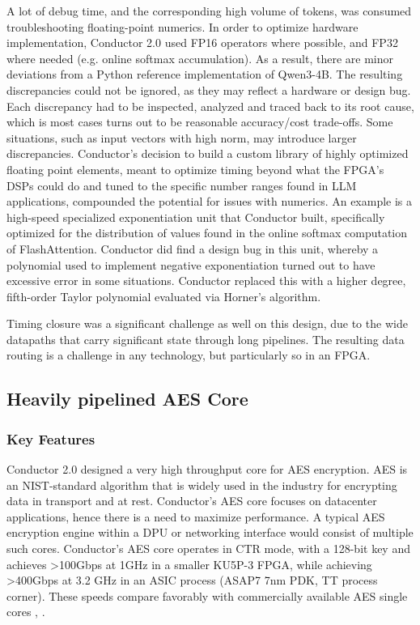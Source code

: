 A lot of debug time, and the corresponding high volume of tokens, was consumed troubleshooting floating-point numerics. In order to optimize hardware implementation, Conductor 2.0 used FP16 operators where possible, and FP32 where needed (e.g. online softmax accumulation). As a result, there are minor deviations from a Python reference implementation of Qwen3-4B. The resulting discrepancies could not be ignored, as they may reflect a hardware or design bug. Each discrepancy had to be inspected, analyzed and traced back to its root cause, which is most cases turns out to be reasonable accuracy/cost trade-offs. Some situations, such as input vectors with high norm, may introduce larger discrepancies. Conductor's decision to build a custom library of highly optimized floating point elements, meant to optimize timing beyond what the FPGA's DSPs could do and tuned to the specific number ranges found in LLM applications, compounded the potential for issues with numerics. An example is a high-speed specialized exponentiation unit that Conductor built, specifically optimized for the distribution of values found in the online softmax computation of FlashAttention. Conductor did find a design bug in this unit, whereby a polynomial used to implement negative exponentiation turned out to have excessive error in some situations. Conductor replaced this with a higher degree, fifth-order Taylor polynomial evaluated via Horner's algorithm.

Timing closure was a significant challenge as well on this design, due to the wide datapaths that carry significant state through long pipelines. The resulting data routing is a challenge in any technology, but particularly so in an FPGA.

\subsection{Heavily pipelined AES Core}

\subsubsection{Key Features}

Conductor 2.0 designed a very high throughput core for AES encryption. AES is an NIST-standard algorithm \cite{aes} that is widely used in the industry for encrypting data in transport and at rest. Conductor's AES core focuses on datacenter applications, hence there is a need to maximize performance. A typical AES encryption engine within a DPU or networking interface would consist of multiple such cores. Conductor's AES core operates in CTR mode, with a 128-bit key and achieves >100Gbps at 1GHz in a smaller KU5P-3 FPGA, while achieving >400Gbps at 3.2 GHz in an ASIC process (ASAP7 7nm PDK, TT process corner). These speeds compare favorably with commercially available AES single cores \cite{synopsys_aes_xts_ecb_ip}, \cite{altera_aes_128_ip}.

